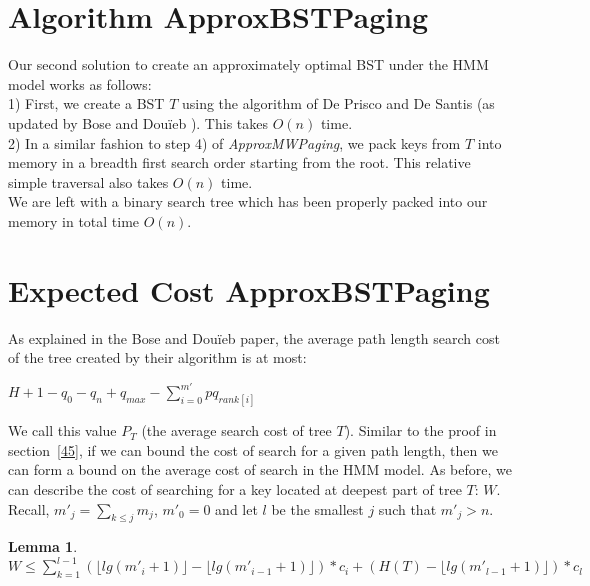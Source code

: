 \documentclass[letterpaper,12pt,titlepage,oneside,final]{book}
\theoremstyle{plain}
\newtheorem{lem}[thm]{Lemma}
\begin{document}
\section{Algorithm ApproxBSTPaging}\label{Algorithm ApproxBSTPaging}

Our second solution to create an approximately optimal BST under the HMM model works as follows: \\

1) First, we create a BST $T$ using the algorithm of De Prisco and De Santis \cite{de1993binary} (as updated by Bose and Dou\"{i}eb \cite{bose2009efficient}). This takes $O(n)$ time. \\

2) In a similar fashion to step 4) of \textit{ApproxMWPaging}, we pack keys from $T$ into memory in a breadth first search order starting from the root. This relative simple traversal also takes $O(n)$ time. \\

We are left with a binary search tree which has been properly packed into our memory in total time $O(n)$.


\section{Expected Cost ApproxBSTPaging}

As explained in the Bose and Dou\"{i}eb paper, the average path length search cost of the tree created by their algorithm is at most: \cite{bose2009efficient}
\begin{center}
$H + 1 - q_0 - q_n + q_{max} - \sum_{i=0}^{m'} pq_{rank[i]}$
\end{center}

We call this value $P_T$ (the average search cost of tree $T$). Similar to the proof in section~\ref{45}, if we can bound the cost of search for a given path length, then we can form a bound on the average cost of search in the HMM model. As before, we can describe the cost of searching for a key located at deepest part of tree $T$: $W$. Recall, $m'_j = \sum_{k \leq j} m_j$, $m'_0 = 0$ and let $l$ be the smallest $j$ such that $m'_j > n$.

\begin{lem} \hspace{1cm} \\
$W \leq \sum_{k=1}^{l-1} (\lfloor lg(m'_i+1) \rfloor - \lfloor lg(m'_{i-1}+1) \rfloor)*c_i+ (H(T) - \lfloor lg(m'_{l-1}+1) \rfloor)*c_l$ 
\end{lem}
\end{document}
